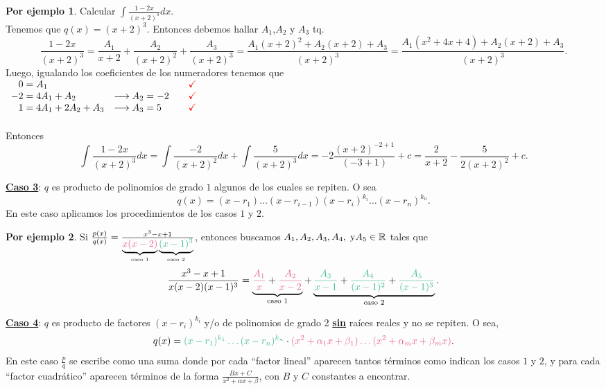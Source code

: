 \documentclass{article}
\theoremstyle{definition}
\theoremstyle{definition}
\newtheorem*{ej}{Por ejemplo}
\theoremstyle{remark}
\newcommand\R{\ensuremath{\mathbb{R}}}
\newcommand\ok{\checkmark}
\begin{document}
\begin{ej}
Calcular $\int\frac{1-2x}{(x+2)^3}dx$.\\
Tenemos que $q(x)=(x+2)^3$. Entonces debemos hallar $A_1$,$A_2$ y $A_3$ tq. \[
\frac{1-2x}{(x+2)^3}
=
\frac{A_1}{x+2}+\frac{A_2}{(x+2)^2}+\frac{A_3}{(x+2)^3}
=
\frac{A_1  (x+2)^2 + A_2  (x+2) + A_3}{(x+2)^3}
=
\frac{A_1(x^2+4x+4)+A_2(x+2)+A_3}{(x+2)^3}.
\]
Luego, igualando los coeficientes de los numeradores tenemos que \\
$\begin{array}{llll}
\phantom{-}0 = A_1        &                         &       & \textcolor{red}{\ok}    \\
-2=4A_1+A_2    & \longrightarrow A_2=-2  &       & \textcolor{red}{\ok}    \\
\phantom{-}1=4A_1+2A_2+A_3& \longrightarrow A_3 = 5 &       & \textcolor{red}{\ok}
\end{array}$ \\ \\
Entonces \[
\int{\frac{1-2x}{(x+2)^3}dx}
=
\int{\frac{-2}{(x+2)^2}dx}+\int{\frac{5}{(x+2)^3}dx}
=
-2\frac{(x+2)^{-2+1}}{(-3+1)}+c
=
\frac{2}{x+2}-\frac{5}{2(x+2)^2}+c.
\]
\end{ej}

\underline{\textbf{Caso 3}}: $q$ es producto de polinomios de grado $1$ algunos de los cuales se repiten. O sea \[
q(x)=(x-r_1)\dots(x-r_{i-1})(x-r_i)^{k_i}\dots(x-r_n)^{k_n}.
\]
En este caso aplicamos los procedimientos de los casos $1$ y $2$.

\begin{ej}
Si $\frac{p(x)}{q(x)}
=
\frac{x^3-x+1}{\underbrace{\textcolor{rojop}{x(x-2)}}_{\text{caso 1}}\underbrace{\textcolor{verdep}{(x-1)^3}}_{\text{caso 2}}}$, entonces buscamos $A_1, A_2, A_3, A_4, \; \text {y} \\ A_5 \in \R $ tales que \[
\frac{x^3-x+1}{x(x-2)(x-1)^3}
=
\underbrace{\textcolor{rojop}{\frac{A_1}{x}}+\textcolor{rojop}{\frac{A_2}{x-2}}}_{\text{caso 1}}
+
\underbrace{\textcolor{verdep}{\frac{A_3}{x-1}}+\textcolor{verdep}{\frac{A_4}{(x-1)^2}}+\textcolor{verdep}{\frac{A_5}{(x-1)^3}}}_{\text{caso 2}}.
\]
\end{ej}
\pagebreak
\underline{\textbf{Caso 4}}: $q$ es producto de factores $(x-r_i)^{k_i}$ y/o de polinomios de grado 2 \underline{\textbf{sin}} raíces reales y no se repiten. O sea, \[
q(x)=
\textcolor{verdep}{(x-r_1)^{k_1} \dots (x-r_n)^{k_n} }
\cdot
\textcolor{rojop}{(x^2+\alpha_1x+\beta_1) \dots (x^2+\alpha_mx+\beta_mx)}.
\]
En este caso $\frac{p}{q}$ se escribe como una suma donde por cada ``\textcolor{verdep}{factor lineal}''  aparecen tantos términos como indican los casos $1$ y $2$, y para cada ``\textcolor{rojop}{factor cuadrático}'' aparecen términos de la forma $\frac{Bx+C}{x^2+\alpha x+\beta}$, con $B$ y $C$ constantes a encontrar.
\end{document}
